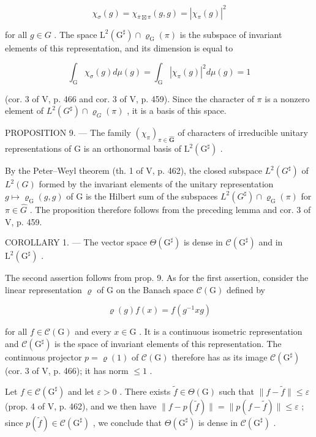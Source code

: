 \[
\chi_ {\sigma} (g) = \chi_ {\overline {{\pi}} \boxtimes \pi} (g, g) = | \chi_ {\pi} (g) | ^ {2}
\]

for all \(g \in G\) . The space \(\mathrm{L}^2 (\mathrm{G}^\sharp) \cap \varrho_{\mathrm{G}}(\pi)\) is the subspace of invariant elements of this representation, and its dimension is equal to

\[
\int_ {\mathrm{G}} \chi_ {\sigma} (g) d \mu (g) = \int_ {\mathrm{G}} | \chi_ {\pi} (g) | ^ {2} d \mu (g) = 1
\]

(cor. 3 of V, p. 466 and cor. 3 of V, p. 459). Since the character of \(\pi\) is a nonzero element of \(L^2(G^\sharp) \cap \varrho_G(\pi)\) , it is a basis of this space.

PROPOSITION 9. --- The family \((\chi_{\pi})_{\pi \in \widehat{\mathbf{G}}}\) of characters of irreducible unitary representations of G is an orthonormal basis of \(\mathrm{L}^2 (\mathrm{G}^\sharp)\) .

By the Peter--Weyl theorem (th. 1 of V, p. 462), the closed subspace \(L^{2}(G^{\sharp})\) of \(L^{2}(G)\) formed by the invariant elements of the unitary representation \(g \mapsto \varrho_{\mathrm{G}}(g, g)\) of G is the Hilbert sum of the subspaces \(L^{2}(G^{\sharp}) \cap \varrho_{\mathrm{G}}(\pi)\) for \(\pi \in \widehat{G}\) . The proposition therefore follows from the preceding lemma and cor. 3 of V, p. 459.

COROLLARY 1. --- The vector space \(\Theta(\mathrm{G}^{\sharp})\) is dense in \(\mathcal{C}(\mathrm{G}^{\sharp})\) and in \(\mathrm{L}^{2}(\mathrm{G}^{\sharp})\) .

The second assertion follows from prop. 9. As for the first assertion, consider the linear representation \(\varrho\) of G on the Banach space \(\mathcal{C}(\mathrm{G})\) defined by

\[
\varrho (g) f (x) = f (g ^ {- 1} x g)
\]

for all \(f \in \mathcal{C}(\mathrm{G})\) and every \(x \in \mathrm{G}\) . It is a continuous isometric representation and \(\mathcal{C}(\mathrm{G}^{\sharp})\) is the space of invariant elements of this representation. The continuous projector \(p = \varrho(1)\) of \(\mathcal{C}(\mathrm{G})\) therefore has as its image \(\mathcal{C}(\mathrm{G}^{\sharp})\) (cor. 3 of V, p. 466); it has norm \(\leqslant 1\) .

Let \(f \in \mathcal{C}(\mathrm{G}^{\sharp})\) and let \(\varepsilon > 0\) . There exists \(\widetilde{f} \in \Theta(\mathrm{G})\) such that \(\|f - \widetilde{f}\| \leqslant \varepsilon\) (prop. 4 of V, p. 462), and we then have \(\|f - p(\widetilde{f})\| = \|p(f - \widetilde{f})\| \leqslant \varepsilon\) ; since \(p(\widetilde{f}) \in \mathcal{C}(\mathrm{G}^{\sharp})\) , we conclude that \(\Theta(\mathrm{G}^{\sharp})\) is dense in \(\mathcal{C}(\mathrm{G}^{\sharp})\) .

